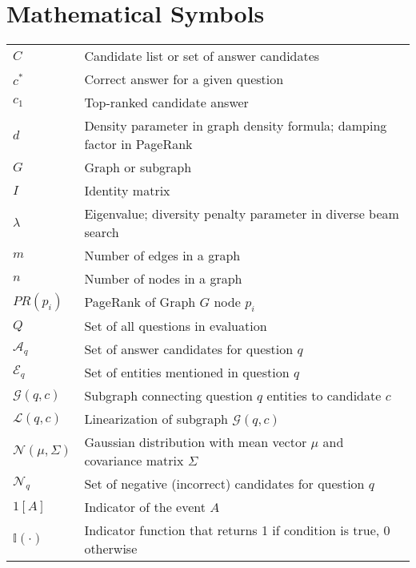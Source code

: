 \section*{Mathematical Symbols}
\begin{tabularx}{\textwidth}{lX}
    $C$ & Candidate list or set of answer candidates \\
    $c^*$ & Correct answer for a given question \\
    $c_1$ & Top-ranked candidate answer \\
    $d$ & Density parameter in graph density formula; damping factor in PageRank \\
    $G$ & Graph or subgraph \\
    $I$ & Identity matrix \\
    $\lambda$ & Eigenvalue; diversity penalty parameter in diverse beam search \\
    $m$ & Number of edges in a graph \\
    $n$ & Number of nodes in a graph \\
    $PR(p_i)$ & PageRank of Graph $G$ node $p_i$ \\
    $Q$ & Set of all questions in evaluation \\
    $\mathcal{A}_q$ & Set of answer candidates for question $q$ \\
    $\mathcal{E}_q$ & Set of entities mentioned in question $q$ \\
    $\mathcal{G}(q, c)$ & Subgraph connecting question $q$ entities to candidate $c$ \\
    $\mathcal{L}(q, c)$ & Linearization of subgraph $\mathcal{G}(q, c)$ \\
    $\mathcal{N}(\mu, \Sigma)$ & Gaussian distribution with mean vector $\mu$ and covariance matrix $\Sigma$\\
    $\mathcal{N}_q$ & Set of negative (incorrect) candidates for question $q$ \\
    $1\left[A\right]$ & Indicator of the event $A$ \\
    $\mathbb{I}(\cdot)$ & Indicator function that returns 1 if condition is true, 0 otherwise \\
\end{tabularx}
